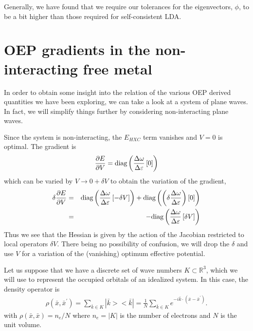 \documentclass{article}
\newcommand{\beas}{\begin{eqnarray*}}
\newcommand{\enas}{\end{eqnarray*}}
\newcommand{\reals}{\mathbb{R}}
\newcommand{\Vscp}{V}
\begin{document}
Generally, we have found that we require our tolerances for the
eigenvectors, $\phi$, to be a bit higher than those required for
self-consistent LDA.

\section{OEP gradients in the non-interacting free metal}

In order to obtain some insight into the relation of the various
OEP derived quantities we have been exploring, we can take a look at a
system of plane waves.  In fact, we will simplify things further by
considering non-interacting plane waves.

Since the system is non-interacting, the $E_{HXC}$ term vanishes
and $\Vscp = 0$ is optimal.  The gradient is
\beas
  \frac{\partial E}{\partial \Vscp} = 
\diag\left(\frac{\Delta \omega}{\Delta \varepsilon}\left[ 0 \right]\right)
\enas
which can be varied by $\Vscp \rightarrow 0 + \delta V$ to obtain
the variation of the gradient,
\beas
\delta \frac{\partial E}{\partial \Vscp} &=& 
\diag\left(\frac{\Delta \omega}{\Delta \varepsilon}\left[ -\delta V \right]\right)
+\diag\left(\left(\delta \frac{\Delta \omega}{\Delta \varepsilon}\right)\left[ 0 \right]\right)
\\
&=&
-\diag\left(\frac{\Delta \omega}{\Delta \varepsilon}\left[ \delta V \right]\right)
\enas
Thus we see that the Hessian is given by the action of the Jacobian
restricted to local operators $\delta V$.  There being no possibility
of confusion, we will drop the $\delta$ and use $V$ for a variation of
the (vanishing) optimum effective potential.

Let us suppose that we have a discrete set of wave numbers $K \subset
\reals^3$, which we will use to represent the occupied orbitals of an
idealized system.  In this case, the density operator is
\beas
\rho(\bar{x},\bar{x}^\prime)
= \sum_{\bar{k} \in K} |\bar{k}><\bar{k}|
= \frac{1}{N} \sum_{\bar{k}\in K} e^{-i\bar{k} \cdot(\bar{x}-\bar{x}^\prime)}.
\enas
with $\rho(\bar{x},\bar{x}) = n_e/N$ where $n_e = |K|$ is the number of
electrons and $N$ is the unit volume.
\end{document}
